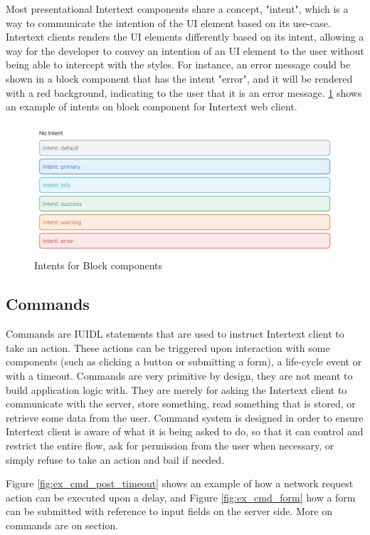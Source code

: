 Most presentational Intertext components share a concept, "intent", which is a way to communicate the intention of the UI element based on its use-case. Intertext clients renders the UI elements differently based on its intent, allowing a way for the developer to convey an intention of an UI element to the user without being able to intercept with the styles. For instance, an error message could be shown in a block component that has the intent "error", and it will be rendered with a red background, indicating to the user that it is an error message. \ref{fig:intents} shows an example of intents on block component for Intertext web client.

\begin{figure}
  \centering
  \includegraphics[width=13cm]{thesis/paper/images/intents.png}
  \caption{Intents for Block components}%
  \label{fig:intents}%
\end{figure}

\subsection{Commands}

Commands are IUIDL statements that are used to instruct Intertext client to take an action. These actions can be triggered upon interaction with some components (such as clicking a button or submitting a form), a life-cycle event or with a timeout. Commands are very primitive by design, they are not meant to build application logic with. They are merely for asking the Intertext client to communicate with the server, store something, read something that is stored, or retrieve some data from the user. Command system is designed in order to ensure Intertext client is aware of what it is being asked to do, so that it can control and restrict the entire flow, ask for permission from the user when necessary, or simply refuse to take an action and bail if needed. 

Figure \ref{fig:ex_cmd_post_timeout} shows an example of how a network request action can be executed upon a delay, and Figure \ref{fig:ex_cmd_form} how a form can be submitted with reference to input fields on the server side. More on commands are on  section.

